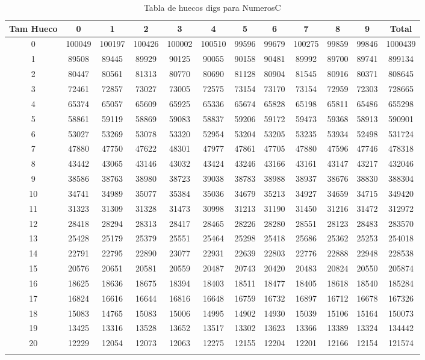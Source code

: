 \documentclass[a4paper]{article}
\begin{document}
\begin{table}
\begin{tabular}{cccccccccccc}
\\\hline
Tam Hueco&0&1&2&3&4&5&6&7&8&9&Total\\\hline
0&100049&100197&100426&100002&100510&99596&99679&100275&99859&99846&1000439\\
1&89508&89445&89929&90125&90055&90158&90481&89992&89700&89741&899134\\
2&80447&80561&81313&80770&80690&81128&80904&81545&80916&80371&808645\\
3&72461&72857&73027&73005&72575&73154&73170&73154&72959&72303&728665\\
4&65374&65057&65609&65925&65336&65674&65828&65198&65811&65486&655298\\
5&58861&59119&58869&59083&58837&59206&59172&59473&59368&58913&590901\\
6&53027&53269&53078&53320&52954&53204&53205&53235&53934&52498&531724\\
7&47880&47750&47622&48301&47977&47861&47705&47880&47596&47746&478318\\
8&43442&43065&43146&43032&43424&43246&43166&43161&43147&43217&432046\\
9&38586&38763&38980&38723&39038&38783&38988&38937&38676&38830&388304\\
10&34741&34989&35077&35384&35036&34679&35213&34927&34659&34715&349420\\
11&31323&31309&31328&31473&30998&31213&31190&31450&31216&31472&312972\\
12&28418&28294&28313&28417&28465&28226&28280&28551&28123&28483&283570\\
13&25428&25179&25379&25551&25464&25298&25418&25686&25362&25253&254018\\
14&22791&22795&22890&23077&22931&22639&22803&22776&22888&22948&228538\\
15&20576&20651&20581&20559&20487&20743&20420&20483&20824&20550&205874\\
16&18625&18636&18675&18394&18403&18511&18477&18405&18618&18540&185284\\
17&16824&16616&16644&16816&16648&16759&16732&16897&16712&16678&167326\\
18&15083&14765&15083&15006&14995&14902&14930&15039&15106&15164&150073\\
19&13425&13316&13528&13652&13517&13302&13623&13366&13389&13324&134442\\
20&12229&12054&12073&12063&12275&12155&12204&12201&12166&12154&121574\\
\\\hline
\end{tabular}
\caption{\label{tab:huecosdigsNumerosC}Tabla de huecos digs para NumerosC}
\end{table}
\end{document}

